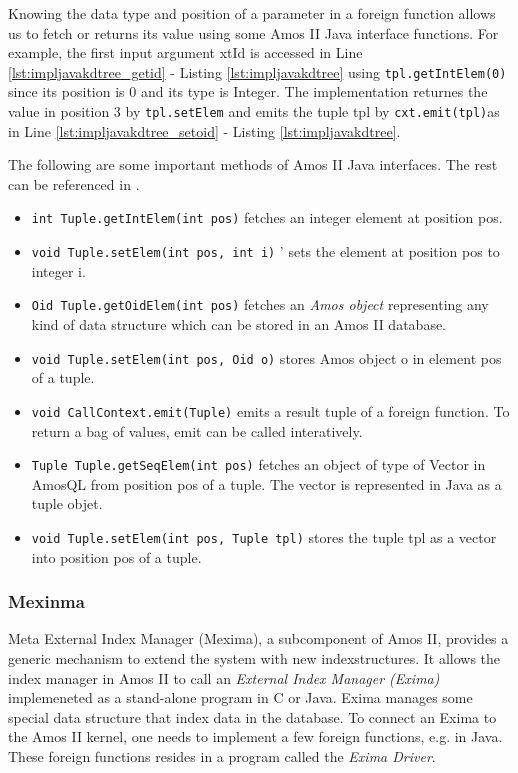 \documentclass[12pt]{article}
\begin{document}
Knowing the data type and position of a parameter in a foreign
function allows us to fetch or returns its value using some Amos II
Java interface functions. For example, the first input argument xtId
is accessed in Line
\ref{lst:impljavakdtree_getid} - Listing \ref{lst:impljavakdtree}
using \texttt{tpl.getIntElem(0)} since its position is 0 and its type
is Integer. The implementation returnes the value in position 3 by
\texttt{tpl.setElem} and emits the tuple tpl by
\texttt{cxt.emit(tpl)}as in Line \ref{lst:impljavakdtree_setoid} -
Listing \ref{lst:impljavakdtree}.

The following are some important methods of Amos II Java
interfaces. The rest can be referenced in \cite{AmosIIJava}.
\begin{itemize}
\item 
\texttt{int Tuple.getIntElem(int pos)} fetches an integer element at position pos.
\item 
\texttt{void Tuple.setElem(int pos, int i)} '
sets the element at position pos to integer i.
\item \texttt{Oid Tuple.getOidElem(int pos)} 
fetches an \emph{Amos object} representing any kind of data structure
which can be stored in an Amos II database.
\item \texttt{void Tuple.setElem(int pos, Oid o)}
stores Amos object o in element pos of a tuple.
\item \texttt{void CallContext.emit(Tuple)} 
emits a result tuple of a foreign function. To return a bag of
values, emit can be called interatively.
\item \texttt{Tuple Tuple.getSeqElem(int pos)}
fetches an object of type of Vector in AmosQL from position pos of a
tuple. The vector is represented in Java as a tuple objet.
\item \texttt{void Tuple.setElem(int pos, Tuple tpl)} 
stores the tuple tpl as a vector into position pos of a tuple.
\end{itemize}

\subsubsection{Mexinma}
Meta External Index Manager (Mexima), a subcomponent of Amos II,
provides a generic mechanism to extend the system with new
indexstructures. It allows the index manager in Amos II to call  an
\emph{External Index Manager (Exima)} implemeneted as a stand-alone
program in C or Java. Exima manages some special data
structure that index data in the database. To connect an
Exima to the Amos II kernel, one needs to implement a few foreign
functions, e.g. in Java. These foreign functions
resides in a program called the
\emph{Exima Driver}.
\end{document}
